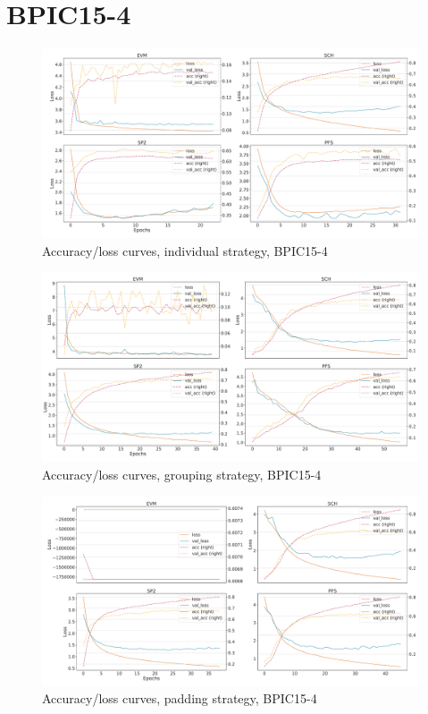 \section*{BPIC15-4}
\begin{figure}[!htb]
    \centering
    \includegraphics[width=\textwidth]{gfx/bpic2015_4/individual_loss_acc_curve.pdf}
    \caption{Accuracy/loss curves, individual strategy, BPIC15-4}
\end{figure}
\begin{figure}[!htb]
    \centering
    \includegraphics[width=\textwidth]{gfx/bpic2015_4/grouped_loss_acc_curve.pdf}
    \caption{Accuracy/loss curves, grouping strategy, BPIC15-4}
\end{figure}
\begin{figure}[!htb]
    \centering
    \includegraphics[width=\textwidth]{gfx/bpic2015_4/padded_loss_acc_curve.pdf}
    \caption{Accuracy/loss curves, padding strategy, BPIC15-4}
\end{figure}
